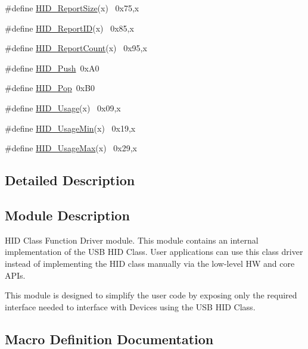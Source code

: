 \begin{DoxyCompactItemize}
\item 
\#define \hyperlink{group__USBD__HID_ga5668073354f3babd845e003e4331a78a}{H\+I\+D\+\_\+\+Report\+Size}(x)        ~0x75,x
\item 
\#define \hyperlink{group__USBD__HID_gabfa642a3db26d600371530456507678a}{H\+I\+D\+\_\+\+Report\+ID}(x)            ~0x85,x
\item 
\#define \hyperlink{group__USBD__HID_ga9513af51ed4caba49fc13acdb8da0d80}{H\+I\+D\+\_\+\+Report\+Count}(x)      ~0x95,x
\item 
\#define \hyperlink{group__USBD__HID_ga4426093eb43ab09033d2399464b8e8da}{H\+I\+D\+\_\+\+Push}~0x\+A0
\item 
\#define \hyperlink{group__USBD__HID_gada716b64e26ea0ba3100fca08fa540cc}{H\+I\+D\+\_\+\+Pop}~0x\+B0
\item 
\#define \hyperlink{group__USBD__HID_gaad219035079572176f4cc832da9d3e4f}{H\+I\+D\+\_\+\+Usage}(x)                  ~0x09,x
\item 
\#define \hyperlink{group__USBD__HID_gad2c0452f307840a3468d89759321af37}{H\+I\+D\+\_\+\+Usage\+Min}(x)            ~0x19,x
\item 
\#define \hyperlink{group__USBD__HID_ga2237e592e6ac264c1d0427c5f5516179}{H\+I\+D\+\_\+\+Usage\+Max}(x)            ~0x29,x
\end{DoxyCompactItemize}


\subsection{Detailed Description}
\hypertarget{group__USBD__HID_Sec_HIDModDescription}{}\subsection{Module Description}\label{group__USBD__HID_Sec_HIDModDescription}
H\+ID Class Function Driver module. This module contains an internal implementation of the U\+SB H\+ID Class. User applications can use this class driver instead of implementing the H\+ID class manually via the low-\/level HW and core A\+P\+Is.

This module is designed to simplify the user code by exposing only the required interface needed to interface with Devices using the U\+SB H\+ID Class. 

\subsection{Macro Definition Documentation}
